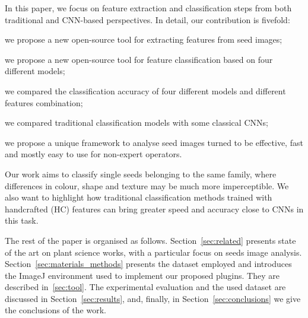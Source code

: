 \documentclass[twocolumn]{svjour3}           %
\begin{document}
In this paper, we focus on feature extraction and classification steps from both traditional and CNN-based perspectives.
In detail, our contribution is fivefold: 
\begin{enumerate*}
    \item we propose a new open-source tool for extracting features from seed images;
    \item we propose a new open-source tool for feature classification based on four different models;
    \item we compared the classification accuracy of four different models and different features combination;
    \item we compared traditional classification models with some classical CNNs;
    \item we propose a unique framework to analyse seed images turned to be effective, fast and mostly easy to use for non-expert operators.
\end{enumerate*}

Our work aims to classify single seeds belonging to the same family, where differences in colour, shape and texture may be much more imperceptible. We also want to highlight how traditional classification methods trained with handcrafted (HC) features can bring greater speed and accuracy close to CNNs in this task.

The rest of the paper is organised as follows. Section~\ref{sec:related} presents state of the art on plant science works, with a particular focus on seeds image analysis. Section~\ref{sec:materials_methods} presents the dataset employed and introduces the ImageJ environment used to implement our proposed plugins. They are described in~\ref{sec:tool}. The experimental evaluation and the used dataset are discussed in Section~\ref{sec:results}, and, finally, in Section~\ref{sec:conclusions} we give the conclusions of the work.

\end{document}
